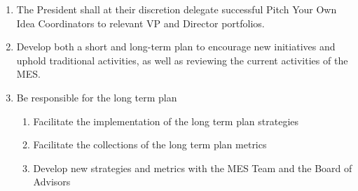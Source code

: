 \begin{enumerate}
  \begin{enumerate}
   \item
    Vice President, Academic
   \item
    Vice President, External Relations
   \item
    Vice President, Finance
   \item
    Vice President, Student Life
   \item
    Vice President, Communications
   \item
    Vice President, Internal
   \item
    Chief Returning Officer
   \item
    Co-Orientation Coordinators
   \item
    Equity, Diversity and Inclusion Officer
   \item
    First Year Council Coordinator
    \item
    MESSCO Coordinator(s)
   \item
    MESSCO Coordinator(s)
   \item
    Program Representatives
   \item
    Pitch Your Own Idea Coordinators
  \end{enumerate}
 \item
  The President shall at their discretion delegate successful Pitch Your Own Idea Coordinators to relevant VP and Director portfolios.
 \item
  Develop both a short and long-term plan to encourage new initiatives and uphold traditional activities, as well as reviewing the current activities of the MES.
 \item
  Be responsible for the long term plan

  \begin{enumerate}
   \item
    Facilitate the implementation of the long term plan strategies
   \item
    Facilitate the collections of the long term plan metrics
   \item
    Develop new strategies and metrics with the MES Team and the Board of Advisors
  \end{enumerate}
\end{enumerate}